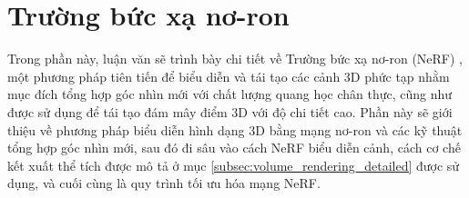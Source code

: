 \section{Trường bức xạ nơ-ron} \label{sec:nerfs}

Trong phần này, luận văn sẽ trình bày chi tiết về Trường bức xạ nơ-ron (NeRF) \cite{Mildenhall2020NeRF}, một phương pháp tiên tiến để biểu diễn và tái tạo các cảnh 3D phức tạp nhằm mục đích tổng hợp góc nhìn mới với chất lượng quang học chân thực, cũng như được sử dụng để tái tạo đám mây điểm 3D với độ chi tiết cao. Phần này sẽ giới thiệu về phương pháp biểu diễn hình dạng 3D bằng mạng nơ-ron và các kỹ thuật tổng hợp góc nhìn mới, sau đó đi sâu vào cách NeRF biểu diễn cảnh, cách cơ chế kết xuất thể tích được mô tả ở mục  \ref{subsec:volume_rendering_detailed} được sử dụng, và cuối cùng là quy trình tối ưu hóa mạng NeRF.



